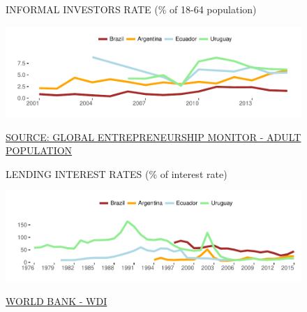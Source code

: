 \documentclass{article}\usepackage[]{graphicx}\usepackage[]{color}
\makeatletter
\def\maxwidth{ %
  \ifdim\Gin@nat@width>\linewidth
    \linewidth
  \else
    \Gin@nat@width
  \fi
}
\makeatother
\begin{document}
\begin{figure}
\begin{minipage}[c]{0.95\textwidth}
  \begin{minipage}[c]{0.95\textwidth} %
    \vspace*{0.6cm}
    \begin{minipage}[c]{0.49\textwidth} %
      \small{\textcolor[HTML]{818181}{INFORMAL INVESTORS RATE \footnotesize(\% of 18-64 population)}}


{\centering \includegraphics[width=\maxwidth]{figure/line_chart_Finance1-1} 

}



      \vspace*{-0.2cm} 
      \scriptsize{\href{http://www.gemconsortium.org/data/sets}{\textcolor[HTML]{22A6F5}{SOURCE: GLOBAL ENTREPRENEURSHIP MONITOR - ADULT POPULATION}}}
    \end{minipage}
    \begin{minipage}[c]{0.49\textwidth} %
      \small{\textcolor[HTML]{818181}{LENDING INTEREST RATES \footnotesize(\% of interest rate)}}


{\centering \includegraphics[width=\maxwidth]{figure/line_chart_Finance2-1} 

}



      \vspace*{-0.2cm} 
      \scriptsize{\href{http://data.worldbank.org}{\textcolor[HTML]{22A6F5}{WORLD BANK - WDI}}}
    \end{minipage}
  \end{minipage}  
  

\end{minipage}
\end{figure}
\end{document}
